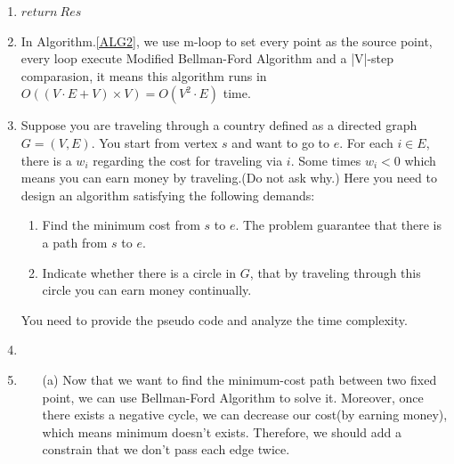 \documentclass[12pt,a4paper]{article}
\makeatletter
\newtheorem*{solution}{Solution}
\theoremstyle{definition}
\renewenvironment{solution}[1][Solution] {\par\pushQED{\qed}\normalfont\topsep6\p@\@plus6\p@\relax\trivlist\item[\hskip\labelsep\bfseries#1\@addpunct{.}]\ignorespaces}{\popQED\endtrivlist\@endpefalse} \makeatother
\makeatother
\begin{document}
\begin{enumerate}
\begin{solution}
\begin{minipage}[t]{0.9\textwidth}
\begin{algorithm}[H]
{{{{{                            }
                        }
                    }
                }
            }
            $return\ Res $\;
       \end{algorithm}
       \end{minipage}
       \hfill

       \item In Algorithm.\ref{ALG2}, we use m-loop to set every point as the source point, every loop execute Modified Bellman-Ford Algorithm and a |V|-step comparasion, it means this algorithm runs in $O((V\cdot E+V)\times V)=O(V^2\cdot E)$ time.

\end{solution}

\item
   Suppose you are traveling through a country defined as a directed graph $G=(V,E)$. You start from vertex $s$ and want to go to $e$. For each $i\in E$, there is a $w_i$ regarding the cost for traveling via $i$. Some times $w_i<0$ which means you can earn money by traveling.(Do not ask why.) Here you need to design an algorithm satisfying the following demands:\par
   \begin{enumerate}
   \item Find the minimum cost from $s$ to $e$. The problem guarantee that there is a path from $s$ to $e$.\par
   \item Indicate whether there is a circle in $G$, that by traveling through this circle you can earn money continually.\par
   \end{enumerate}
   You need to provide the pseudo code and analyze the time complexity.\par

\begin{solution}\item
\renewcommand{\qedsymbol}{}
\begin{itemize}
\item [(a)] Now that we want to find the minimum-cost path between two fixed point, we can use Bellman-Ford Algorithm to solve it. Moreover, once there exists a negative cycle, we can decrease our cost(by earning money), which means minimum doesn't exists. Therefore, we should add a constrain that we don't pass each edge twice.


\end{itemize}
\end{solution}
\end{enumerate}
\end{document}
